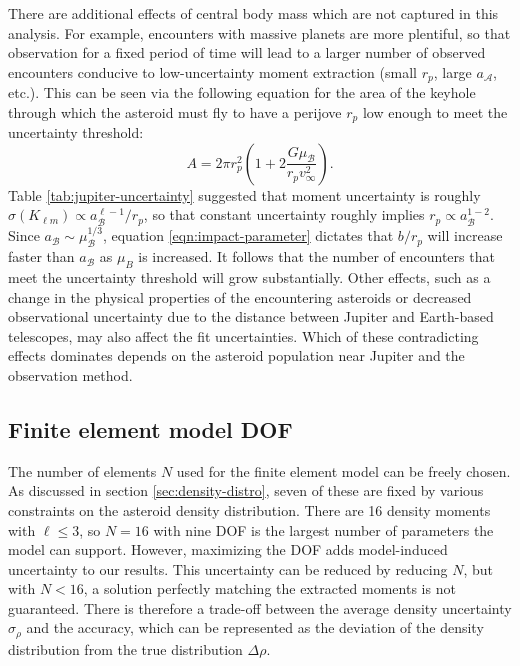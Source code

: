 \documentclass[fleqn,usenatbib]{mnras}
\newcommand{\parens}[1]{\left( #1 \right)}
\begin{document}
There are additional effects of central body mass which are not captured in this analysis. For example, encounters with massive planets are more plentiful, so that observation for a fixed period of time will lead to a larger number of observed encounters conducive to low-uncertainty moment extraction (small $r_p$, large $a_\mathcal{A}$, etc.). This can be seen via the following equation for the area of the keyhole through which the asteroid must fly to have a perijove $r_p$ low enough to meet the uncertainty threshold:
\begin{equation}
  A = 2 \pi r_p^2 \parens{1+2\frac{G\mu_\mathcal{B}}{r_p v_\infty^2}}.
  \label{eqn:impact-parameter}
\end{equation}
Table \ref{tab:jupiter-uncertainty} suggested that moment uncertainty is roughly $\sigma(K_{\ell m}) \propto a_\mathcal{B}^{\ell - 1} / r_p$, so that constant uncertainty roughly implies $r_p \propto a_\mathcal{B}^{1-2}$. Since $a_\mathcal{B} \sim \mu_\mathcal{B}^{1/3}$, equation \ref{eqn:impact-parameter} dictates that $b/r_p$ will increase faster than $a_\mathcal{B}$ as $\mu_B$ is increased. It follows that the number of encounters that meet the uncertainty threshold will grow substantially. Other effects, such as a change in the physical properties of the encountering asteroids or decreased observational uncertainty due to the distance between Jupiter and Earth-based telescopes, may also affect the fit uncertainties. Which of these contradicting effects dominates depends on the asteroid population near Jupiter and the observation method.



\subsection{Finite element model DOF}
\label{sec:dof-scan}
The number of elements $N$ used for the finite element model can be freely chosen. As discussed in section \ref{sec:density-distro}, seven of these are fixed by various constraints on the asteroid density distribution. There are 16 density moments with $\ell \leq 3$, so $N=16$ with nine DOF is the largest number of parameters the model can support. However, maximizing the DOF adds model-induced uncertainty to our results. This uncertainty can be reduced by reducing $N$, but with $N < 16$, a solution perfectly matching the extracted moments is not guaranteed. There is therefore a trade-off between the average density uncertainty $\sigma_\rho$ and the accuracy, which can be represented as the deviation of the density distribution from the true distribution $\Delta \rho$.
\end{document}
